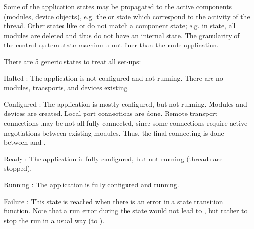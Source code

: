 Some of the application states may be propagated to the 
active components (modules, device objects), e.g. the 
 or  state which correspond to the activity of the thread. 
Other states like  or  do not match a component state; 
e.g. in  state, all modules are deleted and thus do not 
have an internal state. The granularity of the control system state 
machine is not finer than the node application.





There are 5 generic states to treat all set-ups: 
\begin{compactdesc}
\item[Halted] : The application is not configured and not running. 
	 There are no modules, transports, and devices existing.
\item[Configured] : The application is mostly configured, but not running. 
	 Modules and devices are created. Local port connections are done.
	  Remote transport connections may be not all fully connected, 
	  since some connections require active negotiations between existing 
	  modules. Thus, the final connecting is done between 
	   and .  
\item[Ready] : The application is fully configured, but not running 
	 (threads are stopped).
\item[Running] : The application is fully configured and running.
\item[Failure] : This state is reached when there is an error in a 
	 state transition function. Note that a run error during the 
	  state would not lead to , but rather to stop 
	 the run in a usual way (to ).
\end{compactdesc}


